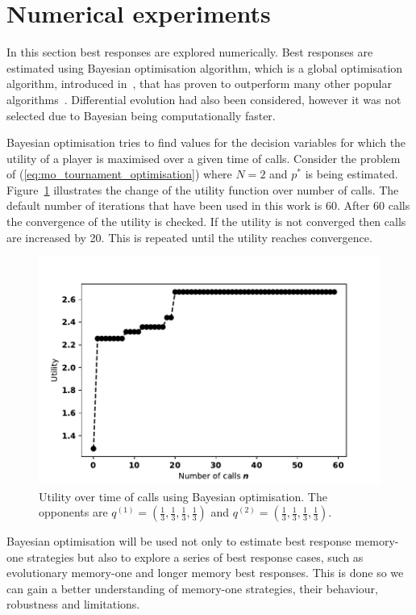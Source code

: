 \documentclass[10pt]{article}
\begin{document}
\section{Numerical experiments} \label{section:numerical_experiments}

In this section best responses are explored numerically. Best responses are
estimated using Bayesian optimisation algorithm, which is a global optimisation
algorithm, introduced in~\cite{Mokus1978}, that has proven to outperform many
other popular algorithms~\cite{Jones2001}. Differential evolution had also been
considered, however it was not selected due to Bayesian being computationally
faster.

Bayesian optimisation tries to find values for the decision variables for which
the utility of a player is maximised over a given time of calls. Consider the
problem of (\ref{eq:mo_tournament_optimisation}) where \(N=2\) and \(p^*\) is
being estimated. Figure~\ref{bayesian_example} illustrates the change of the
utility function over number of calls. The default number of iterations that
have been used in this work is 60. After 60 calls the convergence of the utility
is checked. If the utility is not converged then calls are increased by 20. This
is repeated until the utility reaches convergence.

\begin{figure}[!htbp]
    \begin{center}
    \includegraphics[width=.5\linewidth]{img/bayesian_example.pdf}
    \end{center}
    \caption{Utility over time of calls using Bayesian optimisation. The
    opponents are \(q^{(1)} = (\frac{1}{3}, \frac{1}{3}, \frac{1}{3},
    \frac{1}{3})\) and \(q^{(2)} = (\frac{1}{3}, \frac{1}{3},
    \frac{1}{3}, \frac{1}{3})\).}
    \label{bayesian_example}
\end{figure}

Bayesian optimisation will be used not only to estimate best response memory-one
strategies but also to explore a series of best response cases, such as evolutionary
memory-one and longer memory best responses. This is done so
we can gain a better understanding of memory-one strategies, their behaviour,
robustness and limitations.
\end{document}
